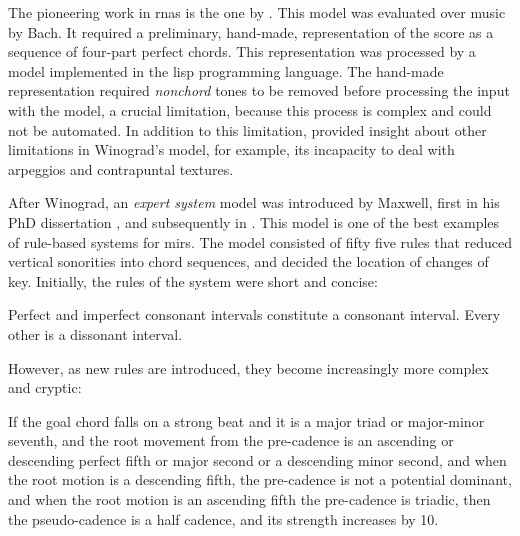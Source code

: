 


The pioneering work in \glspl{rna} is the one by
\textcite{winograd1968linguistics}. This model was evaluated
over music by Bach. It required a preliminary, hand-made,
representation of the score as a sequence of four-part
perfect chords. This representation was processed by a model
implemented in the \gls{lisp} programming language. The
hand-made representation required \emph{nonchord} tones to
be removed before processing the input with the model, a
crucial limitation, because this process is complex and
could not be automated. In addition to this limitation,
\textcite{temperley1997algorithm} provided insight about
other limitations in Winograd's model, for example, its
incapacity to deal with arpeggios and contrapuntal textures.

After Winograd, an \emph{expert system} model was introduced
by Maxwell, first in his PhD dissertation
\parencite{maxwell1984artificial}, and subsequently in
\textcite{maxwell1992expert}. This model is one of the best
examples of rule-based systems for \glspl{mir}. The model
consisted of fifty five rules that reduced vertical
sonorities into chord sequences, and decided the location of
changes of key. Initially, the rules of the system were
short and concise:

\begin{italicquotes}
    Perfect and imperfect consonant intervals constitute a
    consonant interval. Every other is a dissonant interval.
\end{italicquotes}

However, as new rules are introduced, they become
increasingly more complex and cryptic:

\begin{italicquotes}
    If the goal chord falls on a strong beat and it is a
    major triad or major-minor seventh, and the root
    movement from the pre-cadence is an ascending or
    descending perfect fifth or major second or a descending
    minor second, and when the root motion is a descending
    fifth, the pre-cadence is not a potential dominant, and
    when the root motion is an ascending fifth the
    pre-cadence is triadic, then the pseudo-cadence is a
    half cadence, and its strength increases by 10.
\end{italicquotes}

